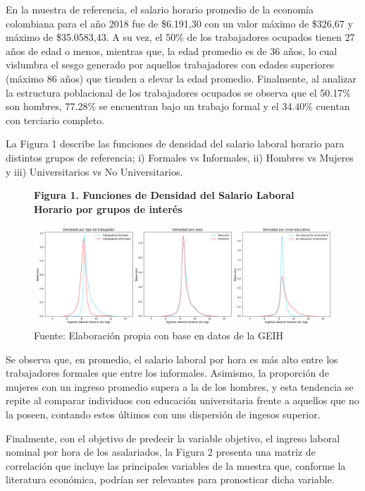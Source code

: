 \documentclass[11pt, a4paper]{article}
\begin{document}
 En la muestra de referencia, el salario horario promedio de la economía colombiana para el año 2018 fue de \$6.191,30 con un valor máximo de \$326,67 y máximo de \$35.0583,43. A su vez, el 50\% de los trabajadores ocupados tienen 27 años de edad o menos, mientras que, la edad promedio es de 36 años, lo cual vislumbra el sesgo generado por aquellos trabajadores con edades superiores (máximo 86 años) que tienden a elevar la edad promedio. 
Finalmente, al analizar la estructura poblacional de los trabajadores ocupados se observa que el 50.17\% son hombres, 77.28\% se encuentran bajo un trabajo formal y el 34.40\% cuentan con terciario completo. 

La Figura 1 describe las funciones de densidad del salario laboral horario para distintos grupos de referencia; i) Formales vs Informales, ii) Hombres vs Mujeres y iii) Universitarios vs No Universitarios. 

\begin{figure}[H]
    \centering
	\caption*{\textbf{Figura 1. Funciones de Densidad del Salario Laboral Horario por grupos de interés}}
  	\captionsetup{justification=centering}
  	\includegraphics[width=16cm]{../Views/grafico1.png}
	\caption*{\small Fuente: Elaboración propia con base en datos de la GEIH }
\end{figure}

Se observa que, en promedio, el salario laboral por hora es más alto entre los trabajadores formales que entre los informales. Asimismo, la proporción de mujeres con un ingreso promedio supera a la de los hombres, y esta tendencia se repite al comparar individuos con educación universitaria frente a aquellos que no la poseen, contando estos últimos con uns dispersión de ingesos superior. 

Finalmente, con el objetivo de predecir la variable objetivo, el ingreso laboral nominal por hora de los asalariados, la Figura 2 presenta una matriz de correlación que incluye las principales variables de la muestra que, conforme la literatura económica, podrían ser relevantes para pronosticar dicha variable. 
\end{document}
